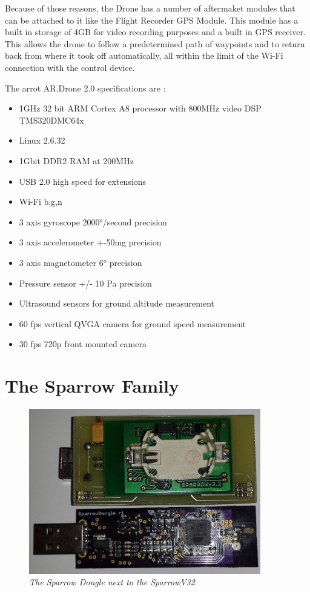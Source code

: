 Because of those reasons, the Drone has a number of aftermaket modules that can be attached to it like 
the Flight Recorder GPS Module. This module has a built in storage of 4GB for video recording purposes and a built in GPS receiver. This allows the drone to follow a predetermined path of waypoints and to return back from where it took off automatically, all within the limit of the Wi-Fi connection with the control device.
 

The arrot AR.Drone 2.0 specifications are :
\begin{itemize}



\item   1GHz 32 bit ARM Cortex A8 processor with 800MHz video DSP TMS320DMC64x
\item   Linux 2.6.32
\item   1Gbit DDR2 RAM at 200MHz
\item   USB 2.0 high speed for extensions
\item   Wi-Fi b,g,n
\item   3 axis gyroscope 2000°/second precision
\item   3 axis accelerometer +-50mg precision
\item   3 axis magnetometer 6° precision
\item   Pressure sensor +/- 10 Pa precision
\item   Ultrasound sensors for ground altitude measurement
\item   60 fps vertical QVGA camera for ground speed measurement
\item	30 fps 720p front mounted camera 	

\end{itemize}


\section{The Sparrow Family}

\begin{figure}[ht]
\begin{center}
\includegraphics[width=0.9\textwidth]{hw_platform/sparrow.jpg}
\end{center}
\caption{\small \itshape{The Sparrow Dongle next to the SparrowV32}}
\end{figure}
 
